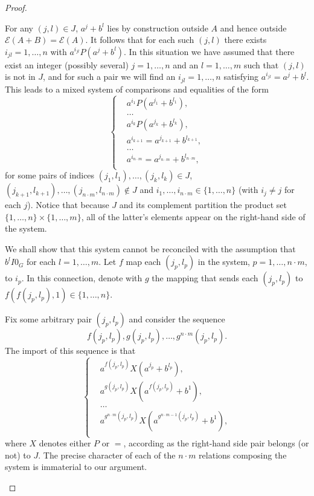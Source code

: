 \documentclass[pdflatex,sn-apa,11pt]{sn-jnl}%
\begin{document}
\begin{proof}
\begin{itemize}
For any $(j,l) \in J$, $a^{j}+b^l$ lies by construction outside $A$ and hence outside $\mathscr{E}(A+B) = \mathscr{E}(A)$. It follows that for each such $(j, l)$ there exists $i_{jl} = 1, \dots, n$ with $a^{i_{jl}}P(a^{j}+b^l)$. In this situation we have assumed that there exist an integer (possibly several) $j = 1, \dots, n$ and an $l = 1, \dots, m$ such that $(j,l)$ is not in $J$, and for such a pair we will find an $i_{jl} = 1, \dots, n$ satisfying $a^{i_{jl}}= a^{j} + b^l$. This leads to a mixed system of comparisons and equalities of the form 
\begin{equation*}
  \left\{
    \begin{aligned}
      & a^{i_{1}}P(a^{j_1} + b^{l_1}), \\
      & \dots \\
      & a^{i_{k}}P(a^{j_k} + b^{l_k}), \\
      & a^{i_{k+1}} = a^{j_{k+1}} + b^{l_{k+1}}, \\
      & \dots \\
      & a^{i_{n \cdot m}} = a^{j_{n\cdot m}} + b^{l_{n \cdot m}}, \\
    \end{aligned}
  \right.
\end{equation*} 
for some pairs of indices $(j_1, l_1), \dots, (j_k, l_k) \in J$, $(j_{k+1}, l_{k+1}), \dots, (j_{n \cdot m}, l_{n \cdot m}) \notin J$ and $i_1, \dots, i_{n \cdot m} \in \{1, \dots, n\}$ (with $i_j \neq j$ for each $j$). Notice that because $J$ and its complement partition the product set $\{1, \dots, n\} \times \{1, \dots, m\}$, all of the latter's elements appear on the right-hand side of the system. 

We shall show that this system cannot be reconciled with the assumption that $b^lI0_G$ for each $l = 1, \dots, m$. Let $f$ map each $(j_p, l_p)$ in the system, $p = 1, \dots, n \cdot m$, to $i_p$. In this connection, denote with $g$ the mapping that sends each $(j_p, l_p)$ to $f(f(j_p, l_p), 1) \in \{1, \dots, n\}$. 

Fix some arbitrary pair $(j_p, l_p)$ and consider the sequence \begin{equation*}f(j_p, l_p), g(j_p, l_p), \dots,  g^{n \cdot m}(j_p, l_p).\end{equation*}
The import of this sequence is that 
\begin{equation*}
  \left\{
    \begin{aligned}
      & a^{f(j_p, l_p)}X(a^{j_p} + b^{l_p}), \\
      & a^{g(j_p, l_p)}X(a^{f(j_p, l_p)} + b^{1}), \\
      & \dots \\
      & a^{g^{n \cdot m}(j_p, l_p)}X(a^{g^{n \cdot m - 1}(j_p, l_p)} + b^{1}), \\
    \end{aligned}
  \right.
\end{equation*} 
where $X$ denotes either $P$ or $=$, according as the right-hand side pair belongs (or not) to $J$. The precise character of each of the $n \cdot m$ relations composing the system is immaterial to our argument.


\end{itemize}
\end{proof}
\end{document}
